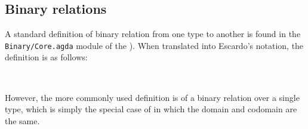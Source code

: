 \documentclass[a4paper,USenglish,cleveref,autoref,thm-restate]{lipics-v2019}
\begin{document}
\subsection{Binary relations}\label{binary-relations-kernels}
A standard definition of binary relation from one type to another is found in the \texttt{Binary/Core.agda} module of the \agdastdlib). When translated into Escardo's notation, the definition is as follows:
\begin{code}%
\>[0]\AgdaSpace{}%
\AgdaSymbol{:}\AgdaSpace{}%
\AgdaSpace{}%
\AgdaSpace{}%
\AgdaSpace{}%
\AgdaSpace{}%
\AgdaSpace{}%
\AgdaSpace{}%
\AgdaSymbol{(}\AgdaSpace{}%
\AgdaSymbol{:}\AgdaSpace{}%
\AgdaSymbol{)}\AgdaSpace{}%
\AgdaSpace{}%
\AgdaSymbol{(}\AgdaSpace{}%
\AgdaSpace{}%
\AgdaSpace{}%
\AgdaSpace{}%
\AgdaSpace{}%
\AgdaSymbol{)}\AgdaSpace{}%
\<%
\\
\>[0]\AgdaSpace{}%
\AgdaSpace{}%
\AgdaSpace{}%
\AgdaSpace{}%
\AgdaSymbol{=}\AgdaSpace{}%
\AgdaSpace{}%
\AgdaSpace{}%
\AgdaSpace{}%
\AgdaSpace{}%
\AgdaSpace{}%
\<%
\end{code}
However, the more commonly used definition is of a binary relation over a single type, which is simply the special case of  in which the domain and codomain are the same.
\begin{code}%
\>[0]\AgdaSpace{}%
\AgdaSymbol{:}\AgdaSpace{}%
\AgdaSpace{}%
\AgdaSpace{}%
\AgdaSpace{}%
\AgdaSymbol{(}\AgdaSpace{}%
\AgdaSymbol{:}\AgdaSpace{}%
\AgdaSymbol{)}\AgdaSpace{}%
\AgdaSpace{}%
\AgdaSpace{}%
\AgdaSpace{}%
\AgdaSpace{}%
\AgdaSpace{}%
\<%
\\
\>[0]\AgdaSpace{}%
\AgdaSpace{}%
\AgdaSpace{}%
\AgdaSymbol{=}\AgdaSpace{}%
\AgdaSpace{}%
\AgdaSpace{}%
\AgdaSpace{}%
\<%
\end{code}
\end{document}
